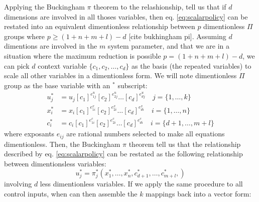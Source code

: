 Applying the Buckingham $\pi$ theorem to the relashionship, tell us that if $d$ dimensions are involved in all thoses variables, then eq. \eqref{eq:scalarpolicy} can be restated into an equivalent dimentionless relationship between $p$ dimentionless $\Pi$ groups where $p \geq (1 + n + m + l ) - d$ [cite bukhingham pi]. Assuming $d$ dimentions are involved in the $m$ system parameter, and that we are in a situation where the maximum reduction is possible $p = (1 + n + m + l ) - d$, we can pick $d$ context variable $\{c_1, c_2 , \hdots,c_d\}$ as the basis (the repeated variables) to scale all other variables in a dimentionless form. We will note dimentionless $\Pi$ group as the base variable with an ${}^*$ subscript:
\begin{align}
u_j^* &= u_j \left[ c_1 \right]^{e^u_{1j}} \left[ c_2 \right]^{e^u_{2j}} \hdots \left[ c_d \right]^{e^u_{dj}} \quad \scriptstyle j = \{ 1, \hdots , k \} \label{eq:piu}\\
x_i^* &= x_i \left[ c_1 \right]^{e^x_{1i}} \left[ c_2 \right]^{e^x_{2i}} \hdots \left[ c_d \right]^{e^x_{di}} \quad \scriptstyle i = \{ 1, \hdots , n \} \label{eq:pix}\\
c_i^* &= c_i\left[ c_1 \right]^{e^c_{1i}} \left[ c_2 \right]^{e^c_{2i}} \hdots \left[ c_d \right]^{e^c_{di}} \quad \scriptstyle i = \{ d+1, \hdots , m+l \} \label{eq:pic}%
\end{align}
where exposants $e_{ij}$ are rational numbers selected to make all equations dimentionless. Then, the Buckingham $\pi$ theorem tell us that the relationship described by eq. \eqref{eq:scalarpolicy} can be restated as the following relationship between  dimentionsless variables:
\begin{equation}
u_j^* = \pi_j^* \left(
x_1^*, \hdots, x_n^*, 
c_{d+1}^*, \hdots, c_{m+l}^*, 
\right) 
\label{eq:scalardimpolicy}
\end{equation}
involving $d$ less dimentionless variables. If we apply the same procedure to all control inputs, when can then assemble the $k$ mappings back into a vector form:
